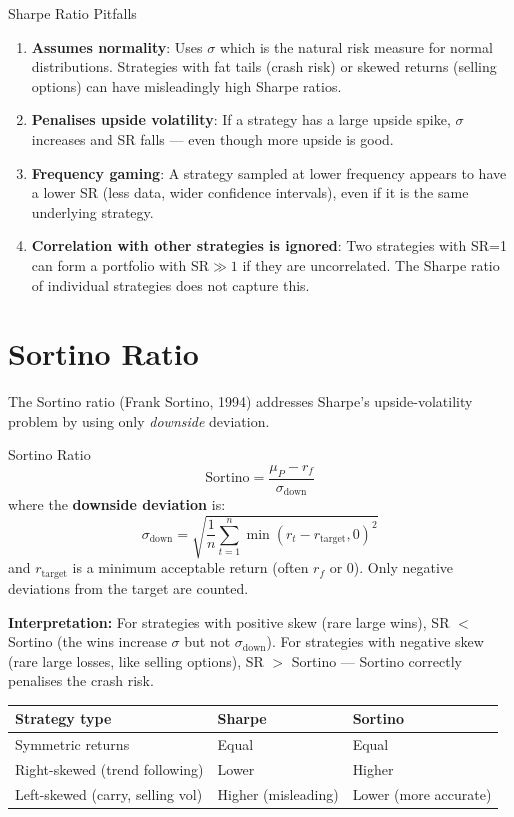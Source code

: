 \documentclass[12pt,a4paper,openany]{report}
\theoremstyle{definition}
\begin{document}
\begin{warningbox}{Sharpe Ratio Pitfalls}
\begin{enumerate}[label=\arabic*.]
  \item \textbf{Assumes normality}: Uses $\sigma$ which is the natural risk measure for normal distributions. Strategies with fat tails (crash risk) or skewed returns (selling options) can have misleadingly high Sharpe ratios.
  \item \textbf{Penalises upside volatility}: If a strategy has a large upside spike, $\sigma$ increases and SR falls — even though more upside is good.
  \item \textbf{Frequency gaming}: A strategy sampled at lower frequency appears to have a lower SR (less data, wider confidence intervals), even if it is the same underlying strategy.
  \item \textbf{Correlation with other strategies is ignored}: Two strategies with SR=1 can form a portfolio with SR$\gg 1$ if they are uncorrelated. The Sharpe ratio of individual strategies does not capture this.
\end{enumerate}
\end{warningbox}

\section{Sortino Ratio}

The Sortino ratio (Frank Sortino, 1994) addresses Sharpe's upside-volatility problem by using only \emph{downside} deviation.

\begin{definitionbox}{Sortino Ratio}
\[
  \text{Sortino} = \frac{\mu_P - r_f}{\sigma_{\text{down}}}
\]
where the \textbf{downside deviation} is:
\[
  \sigma_{\text{down}} = \sqrt{\frac{1}{n}\sum_{t=1}^n \min(r_t - r_{\text{target}}, 0)^2}
\]
and $r_{\text{target}}$ is a minimum acceptable return (often $r_f$ or 0). Only negative deviations from the target are counted.
\end{definitionbox}

\textbf{Interpretation:} For strategies with positive skew (rare large wins), SR $<$ Sortino (the wins increase $\sigma$ but not $\sigma_{\text{down}}$). For strategies with negative skew (rare large losses, like selling options), SR $>$ Sortino — Sortino correctly penalises the crash risk.

\begin{center}
\begin{tabular}{lll}
\toprule
\textbf{Strategy type} & \textbf{Sharpe} & \textbf{Sortino} \\
\midrule
Symmetric returns & Equal & Equal \\
Right-skewed (trend following) & Lower & Higher \\
Left-skewed (carry, selling vol) & Higher (misleading) & Lower (more accurate) \\
\bottomrule
\end{tabular}
\end{center}
\end{document}
